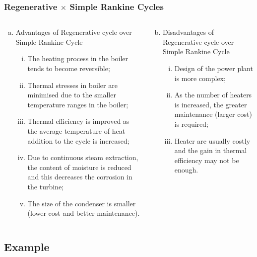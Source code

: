 \documentclass[10pt,compress,handout,ignorenonframetext]{beamer}
\begin{document}
\begin{frame}
 \frametitle{Regenerative $\times$ Simple Rankine Cycles}
  \begin{columns}
   \begin{column}[c]{0.5\linewidth}
    \begin{enumerate}[(a)]
     \item<1-> Advantages of Regenerative cycle over Simple Rankine Cycle
     \begin{enumerate} [(i)]%
      \item<1-> The heating process in the boiler tends to become reversible;
      \item<1-> Thermal stresses in boiler are minimised due to the smaller temperature ranges in the boiler;
      \item<1-> Thermal efficiency is improved as the average temperature of heat addition to the cycle is increased;
      \item<1-> Due to continuous steam extraction, the content of moisture is reduced and this decreases the corrosion in the turbine;
      \item<1-> The size of the condenser is smaller (lower cost and better maintenance).
     \end{enumerate}
    \end{enumerate} 
   \end{column}
%
   \begin{column}[c]{0.5\linewidth}  
    \begin{enumerate}[(a)]\setcounter{enumi}{1}
     \item<2-> Disadvantages of Regenerative cycle over Simple Rankine Cycle
     \begin{enumerate}[(i)] %
      \item<2-> Design of the power plant is more complex;
      \item<2-> As the number of heaters is increased, the greater maintenance (larger cost) is required;
      \item<2-> Heater are usually costly and the gain in thermal efficiency may not be enough. 
     \end{enumerate}
    \end{enumerate} 
   \end{column}
  \end{columns}
  
\end{frame}
 

\subsection{Example}
\end{document}

